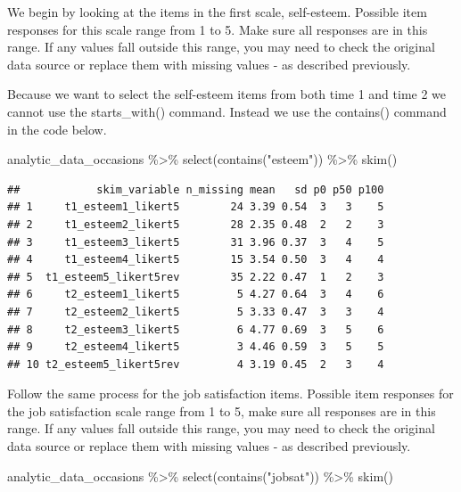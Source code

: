 \documentclass[
]{krantz}
\makeatletter
\newenvironment{Shaded}{\begin{snugshade}}{\end{snugshade}}
\newcommand{\FunctionTok}[1]{\textcolor[rgb]{0,0,0}{#1}}
\newcommand{\NormalTok}[1]{#1}
\newcommand{\SpecialCharTok}[1]{\textcolor[rgb]{0,0,0}{#1}}
\newcommand{\StringTok}[1]{\textcolor[rgb]{0.5,0.5,0.5}{#1}}
\newenvironment{kframe}{%
\medskip{}
\setlength{\fboxsep}{.8em}
 \def\at@end@of@kframe{}%
 \ifinner\ifhmode%
  \def\at@end@of@kframe{\end{minipage}}%
  \begin{minipage}{\columnwidth}%
 \fi\fi%
 \def\FrameCommand##1{\hskip\@totalleftmargin \hskip-\fboxsep
 \colorbox{shadecolor}{##1}\hskip-\fboxsep
     \hskip-\linewidth \hskip-\@totalleftmargin \hskip\columnwidth}%
 \MakeFramed {\advance\hsize-\width
   \@totalleftmargin\z@ \linewidth\hsize
   \@setminipage}}%
 {\par\unskip\endMakeFramed%
 \at@end@of@kframe}
\renewenvironment{Shaded}{\begin{kframe}}{\end{kframe}}
\makeatother
\begin{document}
We begin by looking at the items in the first scale, self-esteem. Possible item responses for this scale range from 1 to 5. Make sure all responses are in this range. If any values fall outside this range, you may need to check the original data source or replace them with missing values - as described previously.

Because we want to select the self-esteem items from both time 1 and time 2 we cannot use the starts\_with() command. Instead we use the contains() command in the code below.

\begin{Shaded}
\begin{Highlighting}[]
\NormalTok{analytic\_data\_occasions }\SpecialCharTok{\%\textgreater{}\%}
  \FunctionTok{select}\NormalTok{(}\FunctionTok{contains}\NormalTok{(}\StringTok{"esteem"}\NormalTok{)) }\SpecialCharTok{\%\textgreater{}\%}
  \FunctionTok{skim}\NormalTok{()}
\end{Highlighting}
\end{Shaded}

\begin{verbatim}
##            skim_variable n_missing mean   sd p0 p50 p100
## 1     t1_esteem1_likert5        24 3.39 0.54  3   3    5
## 2     t1_esteem2_likert5        28 2.35 0.48  2   2    3
## 3     t1_esteem3_likert5        31 3.96 0.37  3   4    5
## 4     t1_esteem4_likert5        15 3.54 0.50  3   4    4
## 5  t1_esteem5_likert5rev        35 2.22 0.47  1   2    3
## 6     t2_esteem1_likert5         5 4.27 0.64  3   4    6
## 7     t2_esteem2_likert5         5 3.33 0.47  3   3    4
## 8     t2_esteem3_likert5         6 4.77 0.69  3   5    6
## 9     t2_esteem4_likert5         3 4.46 0.59  3   5    5
## 10 t2_esteem5_likert5rev         4 3.19 0.45  2   3    4
\end{verbatim}

Follow the same process for the job satisfaction items. Possible item responses for the job satisfaction scale range from 1 to 5, make sure all responses are in this range. If any values fall outside this range, you may need to check the original data source or replace them with missing values - as described previously.

\begin{Shaded}
\begin{Highlighting}[]
\NormalTok{analytic\_data\_occasions }\SpecialCharTok{\%\textgreater{}\%}
  \FunctionTok{select}\NormalTok{(}\FunctionTok{contains}\NormalTok{(}\StringTok{"jobsat"}\NormalTok{)) }\SpecialCharTok{\%\textgreater{}\%}
  \FunctionTok{skim}\NormalTok{()}
\end{Highlighting}
\end{Shaded}
\end{document}
